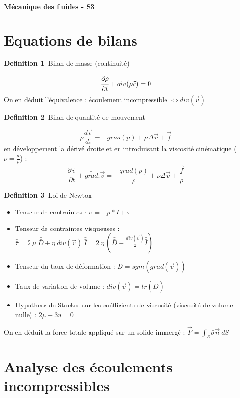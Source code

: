 \documentclass[french]{article}
\theoremstyle{definition}
\newtheorem{definition}{Definition}[section]
\begin{document}
\begin{center}
	\textbf{\Large{Mécanique des fluides - S3}}
\end{center}

\section{Equations de bilans}
\begin{definition}Bilan de masse (continuité)\par
$$ \cfrac{\partial \rho}{\partial t} + div(\rho \vec{v}) = 0 $$
	On en déduit l'équivalence : écoulement incompressible $ \Leftrightarrow div(\vec{v})$
\end{definition}

\begin{definition}Bilan de quantité de mouvement\par
	$$ \rho \frac{d \vec{v}}{dt} = -grad(p) + \mu \Delta\vec{v} + \vec{f} $$
	en développement la dérivé droite et en introduisant la viscosité cinématique ($\nu = \frac{\mu}{\rho}$) :
	$$ \frac{\partial \vec{v}}{\partial t} + \bar{\bar{grad}}.\vec{v} = -\frac{grad(p)}{\rho} + \nu \Delta\vec{v} + \frac{\vec{f}}{\rho} $$
\end{definition}

\begin{definition}Loi de Newton\par
	\begin{itemize} 
		\item Tenseur de contraintes : $\bar{\bar{\sigma}} = -p* \bar{\bar{I}} + \bar{\bar{\tau}}$
		\item Tenseur de contraintes visqueuses : $ \bar{\bar{\tau}} = 2 \ \mu \ \bar{\bar{D}} + \eta \ div(\vec{v}) \ \bar{\bar{I}} = 2 \ \eta \ (\bar{\bar{D}} - \frac{div(\vec{v})}{3} \bar{\bar{I}}) $
		\item Tenseur du taux de déformation : $ \bar{\bar{D}} = sym(\bar{\bar{grad}}(\vec{v})) $
		\item Taux de variation de volume : $div(\vec{v}) = tr(\bar{\bar{D}})$
		\item Hypothese de Stockes sur les coéfficients de viscosité (viscosité de volume nulle) : $ 2 \mu + 3 \eta =0$
	\end{itemize}
	On en déduit la force totale appliqué sur un solide immergé : $ \vec{F} = \int_S \bar{\bar{\sigma}} \vec{n} \ dS $
\end{definition}

\section{Analyse des écoulements incompressibles}
\end{document}
